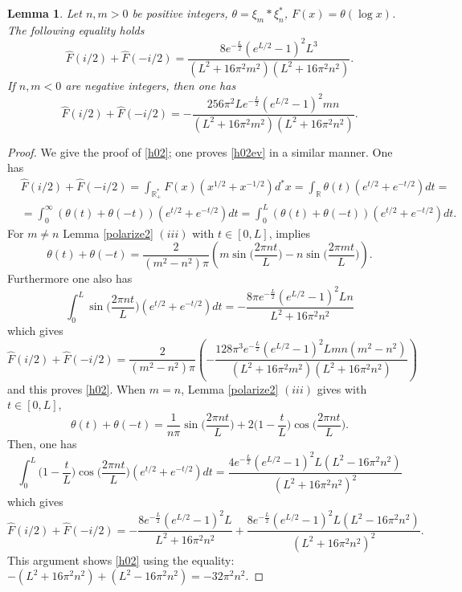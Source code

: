 \documentclass[cupthm]{CUP-JNL-JMJ}
\def\R{{\mathbb R}}
\numberwithin{equation}{section}
\theoremstyle{cupplain}
\newtheorem{lemma}[theorem]{Lemma}
\theoremstyle{cupdefinition}
\theoremstyle{cupremark}
\theoremstyle{cupproof}
\newtheorem{proof}{Proof}
\begin{document}
\begin{lemma}\label{w02} Let $n,m>0$ be positive integers, $\theta =\xi_m*\xi_n^*$,   $F(x)=\theta(\log x)$. The following equality holds
\begin{equation}\label{h02ev}
{\widehat F}(i/2)+{\widehat F}(-i/2)=\frac{8  e^{-\frac{L}{2}} \left(e^{L/2}-1\right)^2 L^3}{\left(L^2+16 \pi ^2 m^2\right) \left(L^2+16 \pi ^2 n^2\right)}.
\end{equation}
If $n,m<0$ are negative integers, then one has
	\begin{equation}\label{h02}
{\widehat F}(i/2)+{\widehat F}(-i/2)=-\frac{256 \pi ^2 L e^{-\frac{L}{2}} \left(e^{L/2}-1\right)^2 m n}{\left(L^2+16 \pi ^2 m^2\right) \left(L^2+16 \pi ^2 n^2\right)}.
\end{equation}
\end{lemma}
\begin{proof} We give the proof of \eqref{h02}; one proves \eqref{h02ev} in a similar manner. One has 
\begin{align*}
&{\widehat F}(i/2)+{\widehat F}(-i/2)=\int_{\R^*_+} F(x)(x^{1/2}+x^{-1/2})d^*x=\int_\R \theta(t)(e^{t/2}+e^{-t/2})dt=\\
&=\int_0^{\infty} (\theta(t)+\theta(-t))(e^{t/2}+e^{-t/2})dt
=\int_0^L (\theta(t)+\theta(-t))(e^{t/2}+e^{-t/2})dt.
\end{align*}
For $m\neq n$   Lemma \ref{polarize2} $(iii)$  with $t\in [0,L]$,  implies 
$$ 
\theta(t)+\theta(-t)=\frac{2}{(m^2-n^2)\pi} \left(m  \sin \Big(\frac{2 \pi n t}{L}\Big)-n  \sin\Big(\frac{2 \pi m t}{L}\Big)\right).
$$
Furthermore one also has 
$$
\int_0^L \sin\Big(\frac{2 \pi n t}{L}\Big)(e^{t/2}+e^{-t/2})dt=-\frac{8 \pi  e^{-\frac{L}{2}} \left(e^{L/2}-1\right)^2 L n}{L^2+16 \pi ^2 n^2}
$$
which gives 
$$
{\widehat F}(i/2)+{\widehat F}(-i/2)=\frac{2}{(m^2-n^2)\pi}\left(-\frac{128 \pi ^3 e^{-\frac{L}{2}} \left(e^{L/2}-1\right)^2 L m n \left(m^2-n^2\right)}{\left(L^2+16 \pi ^2 m^2\right) \left(L^2+16 \pi ^2 n^2\right)}\right)
$$
and this  proves \eqref{h02}. 
When $m=n$,   
 Lemma \ref{polarize2} $(iii)$ gives  with $t\in [0,L]$,
 $$
\theta(t)+\theta(-t)=\frac{1}{n\pi} \sin\Big(\frac{2 \pi n t}{L}\Big) +2\Big(1 -\frac{ t}{L}\Big) \cos\Big(\frac{2 \pi n t}{L}\Big).
$$
Then, one has 
$$
\int_0^L \Big(1 -\frac{ t}{L}\Big)\cos\Big(\frac{2 \pi n t}{L}\Big)(e^{t/2}+e^{-t/2})dt=\frac{4 e^{-\frac{L}{2}} \left(e^{L/2}-1\right)^2 L \left(L^2-16 \pi ^2 n^2\right)}{\left(L^2+16 \pi ^2 n^2\right)^2}$$
which gives 
$$
{\widehat F}(i/2)+{\widehat F}(-i/2)=-\frac{8  e^{-\frac{L}{2}} \left(e^{L/2}-1\right)^2 L }{L^2+16 \pi ^2 n^2}+\frac{8 e^{-\frac{L}{2}} \left(e^{L/2}-1\right)^2 L \left(L^2-16 \pi ^2 n^2\right)}{\left(L^2+16 \pi ^2 n^2\right)^2}.
$$
This argument shows  \eqref{h02} using the equality: $-(L^2+16 \pi ^2 n^2)+(L^2-16 \pi ^2 n^2)=-32 \pi ^2 n^2$.
\end{proof} 
\end{document}
